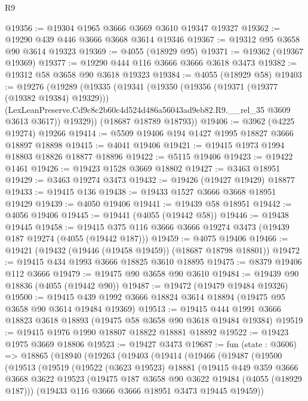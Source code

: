 \begin{lexlean}{R9}
\begin{coremodule}
@19356 := @19304 @1965 @3666 @3669 @3610 @19347 @19327
@19362 := @19290 @439 @446 @3666 @3668 @3614 @19346
@19367 := @19312 @95 @3658 @90 @3614 @19323
@19369 := @4055 (@18929 @95)
@19371 := @19362 (@19367 @19369)
@19377 := @19290 @444 @116 @3666 @3666 @3618 @3473
@19382 := @19312 @58 @3658 @90 @3618 @19323
@19384 := @4055 (@18929 @58)
@19403 := @19276
    (@19289
      (@19335
        (@19341
          (@19350
            (@19356 (@19371 (@19377 (@19382 @19384) @19329)))
            (LexLeanPreserve.Cd9c8c2b60c4d524d486a56043ad9eb82.R9.__rel_35 @3609 @3613 @3617))
          @19329))
      (@18687 @18789 @18793))
@19406 := @3962 (@4225 @19274) @19266
@19414 := @5509 @19406 @194 @1427 @1995 @18827 @3666 @18897 @18898
@19415 := @4041 @19406
@19421 := @19415 @1973 @1994 @18803 @18826 @18877 @18896
@19422 := @5115 @19406
@19423 := @19422 @1461
@19426 := @19423 @1528 @3669 @18802
@19427 := @3463 @18951
@19429 := @3463 @19274 @3473
@19432 := @19426 (@19427 @19429) @18877
@19433 := @19415 @136
@19438 := @19433 @1527 @3666 @3668 @18951 @19429
@19439 := @4050 @19406
@19441 := @19439 @58 @18951
@19442 := @4056 @19406
@19445 := @19441 (@4055 (@19442 @58))
@19446 := @19438 @19445
@19458 := @19415 @375 @116 @3666 @3666 @19274 @3473 (@19439 @187 @19274 (@4055 (@19442 @187)))
@19459 := @4075 @19406
@19466 := @19421 (@19432 (@19446 (@19458 @19459)) (@18687 @18798 @18801))
@19472 := @19415 @434 @1993 @3666 @18825 @3610 @18895
@19475 := @8379 @19406 @112 @3666
@19479 := @19475 @90 @3658 @90 @3610
@19484 := @19439 @90 @18836 (@4055 (@19442 @90))
@19487 := @19472 (@19479 @19484 @19326)
@19500 := @19415 @439 @1992 @3666 @18824 @3614 @18894 (@19475 @95 @3658 @90 @3614 @19484 @19369)
@19513 := @19415 @444 @1991 @3666 @18823 @3618 @18893 (@19475 @58 @3658 @90 @3618 @19484 @19384)
@19519 := @19415 @1976 @1990 @18807 @18822 @18881 @18892
@19522 := @19423 @1975 @3669 @18806
@19523 := @19427 @3473
@19687 := fun (state : @3606) =>
  @18865
    (@18940
      (@19263
        (@19403
          (@19414
            (@19466
              (@19487
                (@19500
                  (@19513
                    (@19519
                      (@19522
                        (@3623 @19523)
                        @18881
                        (@19415
                          @449
                          @359
                          @3666
                          @3668
                          @3622
                          @19523
                          (@19475 @187 @3658 @90 @3622 @19484 (@4055 (@18929 @187)))
                          (@19433 @116 @3666 @3666 @18951 @3473 @19445 @19459))

\end{coremodule}
\end{lexlean}
